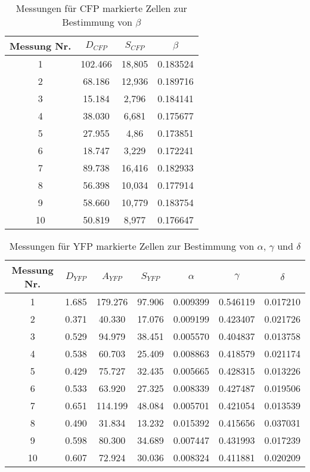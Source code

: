 \begin{table}[h]
    \centering
    \begin{tabular}{c|c|c|c}
         Messung Nr. &        $D_{CFP}$ &           $S_{CFP}$ &      $\beta$ \\ \hline\hline
               1 &  102.466 &      18,805 &  0.183524 \\\hline
               2 &   68.186 &      12,936 &  0.189716 \\\hline
               3 &   15.184 &       2,796 &  0.184141 \\\hline
               4 &   38.030 &       6,681 &  0.175677 \\\hline
               5 &   27.955 &        4,86 &  0.173851 \\\hline
               6 &   18.747 &       3,229 &  0.172241 \\\hline
               7 &   89.738 &      16,416 &  0.182933 \\\hline
               8 &   56.398 &      10,034 &  0.177914 \\\hline
               9 &   58.660 &      10,779 &  0.183754 \\\hline
              10 &   50.819 &       8,977 &  0.176647 \\\hline
        \end{tabular}
    \caption{Messungen für CFP markierte Zellen zur Bestimmung von $\beta$}
\end{table}

\begin{table}[h]
    \centering
    \begin{tabular}{c|c|c|c|c|c|c}
         Messung Nr. &  $D_{YFP}$ & $A_{YFP}$ & $S_{YFP}$ &     $\alpha$ &     $\gamma$ &     $\delta$ \\\hline\hline
         1 &  1.685 &  179.276 &  97.906 &  0.009399 &  0.546119 &  0.017210 \\\hline
         2 &  0.371 &   40.330 &  17.076 &  0.009199 &  0.423407 &  0.021726 \\\hline
         3 &  0.529 &   94.979 &  38.451 &  0.005570 &  0.404837 &  0.013758 \\\hline
         4 &  0.538 &   60.703 &  25.409 &  0.008863 &  0.418579 &  0.021174 \\\hline
         5 &  0.429 &   75.727 &  32.435 &  0.005665 &  0.428315 &  0.013226 \\\hline
         6 &  0.533 &   63.920 &  27.325 &  0.008339 &  0.427487 &  0.019506 \\\hline
         7 &  0.651 &  114.199 &  48.084 &  0.005701 &  0.421054 &  0.013539 \\\hline
         8 &  0.490 &   31.834 &  13.232 &  0.015392 &  0.415656 &  0.037031 \\\hline
         9 &  0.598 &   80.300 &  34.689 &  0.007447 &  0.431993 &  0.017239 \\\hline
        10 &  0.607 &   72.924 &  30.036 &  0.008324 &  0.411881 &  0.020209 \\\hline
        \end{tabular}
    \caption{Messungen für YFP markierte Zellen zur Bestimmung von $\alpha$, $\gamma$ und $\delta$}
\end{table}


